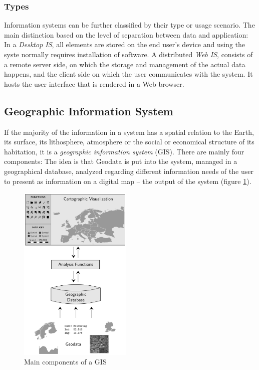 

\subsubsection{Types} %
\label{ssub:types}

Information systems can be further classified by their type or usage scenario. The main distinction based on the level of separation between data and application: In a \emph{Desktop IS}, all elements are stored on the end user's device and using the syste normally requires installation of software. A distributed \emph{Web IS}, consists of a remote server side, on which the storage and management of the actual data happens, and the client side on which the user communicates with the system. It hosts the user interface that is rendered in a Web browser.




\subsection{Geographic Information System} %
\label{sub:geographic_information_system}

If the majority of the information in a system has a spatial relation to the Earth, its surface, its lithosphere, atmosphere or the social or economical structure of its habitation, it is a \emph{geographic information system} (GIS). There are mainly four components: The idea is that Geodata is put into the system, managed in a geographical database, analyzed regarding different information needs of the user to present as information on a digital map -- the output of the system (figure \ref{fig:gis_components}).

\begin{figure}[ht]
  \centering
  \includegraphics[width=0.48\textwidth]{graphics/basics/gis_components}
  \caption{Main components of a GIS}
  \label{fig:gis_components}
\end{figure}

